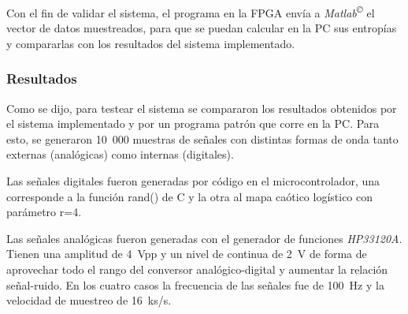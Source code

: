 Con el fin de validar el sistema, el programa en la FPGA envía a \textit{Matlab\textsuperscript\copyright} el vector de datos muestreados, para que se puedan calcular en la PC sus entropías y compararlas con los resultados del sistema implementado.

\subsubsection{Resultados}
\label{sec:resultados}

Como se dijo, para testear el sistema se compararon los resultados obtenidos por el sistema implementado y por un programa patrón que corre en la PC.
Para esto, se generaron 10~000 muestras de señales con distintas formas de onda tanto externas (analógicas) como internas (digitales).

Las señales digitales fueron generadas por código en el microcontrolador, una corresponde a la función rand() de C y la otra al mapa caótico logístico con parámetro r=4.

Las señales analógicas fueron generadas con el generador de funciones \textit{HP33120A}.
Tienen una amplitud de 4~Vpp y un nivel de continua de 2~V de forma de aprovechar todo el rango del conversor analógico-digital y aumentar la relación señal-ruido.
En los cuatro casos la frecuencia de las señales fue de 100~Hz y la velocidad de muestreo de 16~ks/s.


